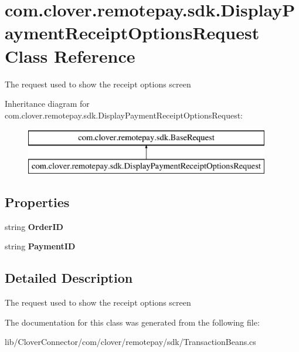 \hypertarget{classcom_1_1clover_1_1remotepay_1_1sdk_1_1_display_payment_receipt_options_request}{}\section{com.\+clover.\+remotepay.\+sdk.\+Display\+Payment\+Receipt\+Options\+Request Class Reference}
\label{classcom_1_1clover_1_1remotepay_1_1sdk_1_1_display_payment_receipt_options_request}


The request used to show the receipt options screen  


Inheritance diagram for com.\+clover.\+remotepay.\+sdk.\+Display\+Payment\+Receipt\+Options\+Request\+:\begin{figure}[H]
\begin{center}
\leavevmode
\includegraphics[height=2.000000cm]{classcom_1_1clover_1_1remotepay_1_1sdk_1_1_display_payment_receipt_options_request}
\end{center}
\end{figure}
\subsection*{Properties}
\begin{DoxyCompactItemize}
\item 
\mbox{\label{classcom_1_1clover_1_1remotepay_1_1sdk_1_1_display_payment_receipt_options_request_a3148fb7709ef41dbc808890795d56177}} 
string {\bfseries Order\+ID}
\item 
\mbox{\label{classcom_1_1clover_1_1remotepay_1_1sdk_1_1_display_payment_receipt_options_request_a2c1c21ab4d1057c583fbbd72e1622665}} 
string {\bfseries Payment\+ID}
\end{DoxyCompactItemize}


\subsection{Detailed Description}
The request used to show the receipt options screen 



The documentation for this class was generated from the following file\+:\begin{DoxyCompactItemize}
\item 
lib/\+Clover\+Connector/com/clover/remotepay/sdk/Transaction\+Beans.\+cs\end{DoxyCompactItemize}
